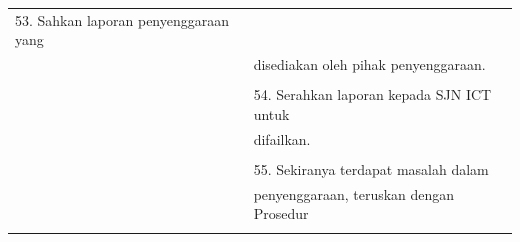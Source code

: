 \documentclass[
]{article}
\begin{document}
\begin{longtable}[]{@{}ll@{}}
\begin{minipage}[t]{0.71\columnwidth}
53. Sahkan laporan penyenggaraan yang\strut
\end{minipage}\tabularnewline
\begin{minipage}[t]{0.23\columnwidth}\raggedright
\strut
\end{minipage} & \begin{minipage}[t]{0.71\columnwidth}\raggedright
disediakan oleh pihak penyenggaraan.\strut
\end{minipage}\tabularnewline
\begin{minipage}[t]{0.23\columnwidth}\raggedright
\strut
\end{minipage} & \begin{minipage}[t]{0.71\columnwidth}\raggedright
\strut
\end{minipage}\tabularnewline
\begin{minipage}[t]{0.23\columnwidth}\raggedright
\strut
\end{minipage} & \begin{minipage}[t]{0.71\columnwidth}\raggedright
54. Serahkan laporan kepada SJN ICT untuk\strut
\end{minipage}\tabularnewline
\begin{minipage}[t]{0.23\columnwidth}\raggedright
\strut
\end{minipage} & \begin{minipage}[t]{0.71\columnwidth}\raggedright
difailkan.\strut
\end{minipage}\tabularnewline
\begin{minipage}[t]{0.23\columnwidth}\raggedright
\strut
\end{minipage} & \begin{minipage}[t]{0.71\columnwidth}\raggedright
\strut
\end{minipage}\tabularnewline
\begin{minipage}[t]{0.23\columnwidth}\raggedright
\strut
\end{minipage} & \begin{minipage}[t]{0.71\columnwidth}\raggedright
55. Sekiranya terdapat masalah dalam\strut
\end{minipage}\tabularnewline
\begin{minipage}[t]{0.23\columnwidth}\raggedright
\strut
\end{minipage} & \begin{minipage}[t]{0.71\columnwidth}\raggedright
penyenggaraan, teruskan dengan Prosedur\strut
\end{minipage}\tabularnewline
\begin{minipage}[t]{0.23\columnwidth}\raggedright

\end{minipage}
\end{longtable}
\end{document}
